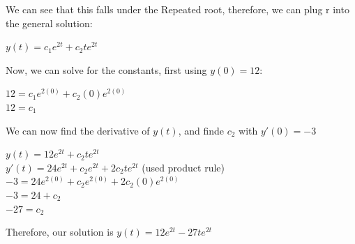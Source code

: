 \documentclass{article}
\begin{document}
We can see that this falls under the Repeated root, therefore, we can plug r into the general solution:

\begin{center}
    $y(t) = c_1 e^{2t} + c_2 te^{2t}$
\end{center}

Now, we can solve for the constants, first using $y(0) = 12$:

\begin{center}
    $12 = c_1 e^{2(0)} + c_2 (0)e^{2(0)}$ \\
    $12 = c_1$
\end{center}

We can now find the derivative of $y(t)$, and finde $c_2$ with $y'(0) = -3$

\begin{center}
    $y(t) = 12 e^{2t} + c_2 te^{2t}$ \\
    $y'(t) = 24 e^{2t} + c_2 e^{2t} + 2c_2te^{2t}$ (used product rule) \\
    $-3 = 24 e^{2(0)} + c_2 e^{2(0)} + 2c_2(0)e^{2(0)}$  \\
    $-3 = 24 + c_2$ \\
    $-27 = c_2$
\end{center}


Therefore, our solution is $y(t) = 12 e^{2t} - 27 te^{2t}$
\end{document}

